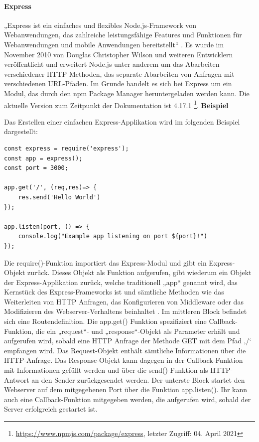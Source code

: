 \paragraph{Express}
„Express ist ein einfaches und flexibles Node.js-Framework von Webanwendungen, das zahlreiche leistungsfähige Features und Funktionen für Webanwendungen und mobile Anwendungen bereitstellt“ \cite{Node1.6}.
Es wurde im November 2010 von Douglas Christopher Wilson und weiteren Entwicklern veröffentlicht und erweitert Node.js unter anderem um das Abarbeiten verschiedener HTTP-Methoden, das separate Abarbeiten von Anfragen mit verschiedenen URL-Pfaden. Im Grunde handelt es sich bei Express um ein Modul, das durch den npm Package Manager heruntergeladen werden kann. Die aktuelle Version zum Zeitpunkt der Dokumentation ist 4.17.1 \footnote{\url{https://www.npmjs.com/package/express}, letzter Zugriff: 04. April 2021}.
\newline
\newline
\textbf{Beispiel}
\newline

\noindent
Das Erstellen einer einfachen Express-Applikation wird im folgenden Beispiel dargestellt:\newline

\begin{lstlisting}[caption=Einfacher Webserver \protect \footnotemark,label=lst:Middleware]
const express = require('express');
const app = express();
const port = 3000;

app.get('/', (req,res)=> {
	res.send('Hello World')
});

app.listen(port, () => {
	console.log("Example app listening on port ${port}!")
});
\end{lstlisting}

\noindent
Die require()-Funktion importiert das Express-Modul und gibt ein Express-Objekt zurück. 
Dieses Objekt als Funktion aufgerufen, gibt wiederum ein Objekt der Express-Applikation zurück, welche traditionell „app“ genannt wird, das Kernstück des Express-Frameworks ist und sämtliche Methoden wie das Weiterleiten von HTTP Anfragen, das Konfigurieren von Middleware oder das Modifizieren des Webserver-Verhaltens beinhaltet \cite{Node1.8}.
\newline
\noindent
Im mittleren Block befindet sich eine Routendefinition. Die app.get() Funktion spezifiziert eine Callback-Funktion, die ein „request“- und „response“-Objekt als Parameter erhält und aufgerufen wird, sobald eine HTTP Anfrage der Methode GET mit dem Pfad ‚/‘ empfangen wird. Das Request-Objekt enthält sämtliche Informationen über die HTTP-Anfrage. Das Response-Objekt kann dagegen in der Callback-Funktion mit Informationen gefüllt werden und über die send()-Funktion als HTTP-Antwort an den Sender zurückgesendet werden.
\newline
\noindent
Der unterste Block startet den Webserver auf dem mitgegebenen Port über die Funktion app.listen(). Ihr kann auch eine Callback-Funktion mitgegeben werden, die aufgerufen wird, sobald der Server erfolgreich gestartet ist.
\newpage

